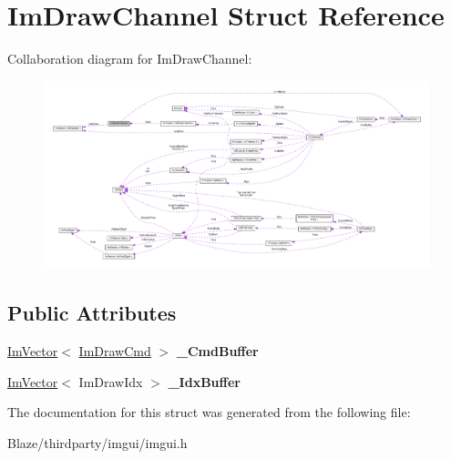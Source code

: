 \hypertarget{structImDrawChannel}{}\section{Im\+Draw\+Channel Struct Reference}
\label{structImDrawChannel}


Collaboration diagram for Im\+Draw\+Channel\+:\nopagebreak
\begin{figure}[H]
\begin{center}
\leavevmode
\includegraphics[width=350pt]{structImDrawChannel__coll__graph}
\end{center}
\end{figure}
\subsection*{Public Attributes}
\begin{DoxyCompactItemize}
\item 
\mbox{\label{structImDrawChannel_a8bb018bc09e2a1f4389c78390a437f78}} 
\hyperlink{structImVector}{Im\+Vector}$<$ \hyperlink{structImDrawCmd}{Im\+Draw\+Cmd} $>$ {\bfseries \+\_\+\+Cmd\+Buffer}
\item 
\mbox{\label{structImDrawChannel_abf48aaacbb4908d4b1ff8b54ee85a45f}} 
\hyperlink{structImVector}{Im\+Vector}$<$ Im\+Draw\+Idx $>$ {\bfseries \+\_\+\+Idx\+Buffer}
\end{DoxyCompactItemize}


The documentation for this struct was generated from the following file\+:\begin{DoxyCompactItemize}
\item 
Blaze/thirdparty/imgui/imgui.\+h\end{DoxyCompactItemize}
